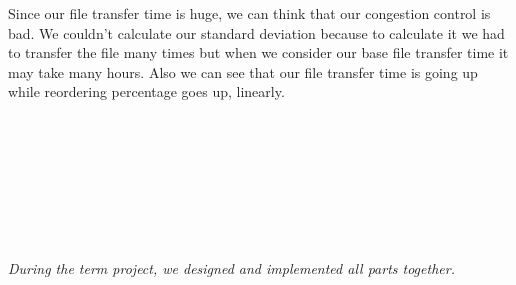 \documentclass[conference]{IEEEtran}
\begin{document}
Since our file transfer time is huge, we can think that our congestion control is bad. We couldn't calculate our standard deviation because to calculate it we had to transfer the file many times but when we consider our base file transfer time it may take many hours. Also we can see that our file transfer time is going up while reordering percentage goes up, linearly.
\\
\\
\\
\\
\\
\\
\\
\\
\\
\textit{During the term project, we designed and implemented all parts together. }
\end{document}

